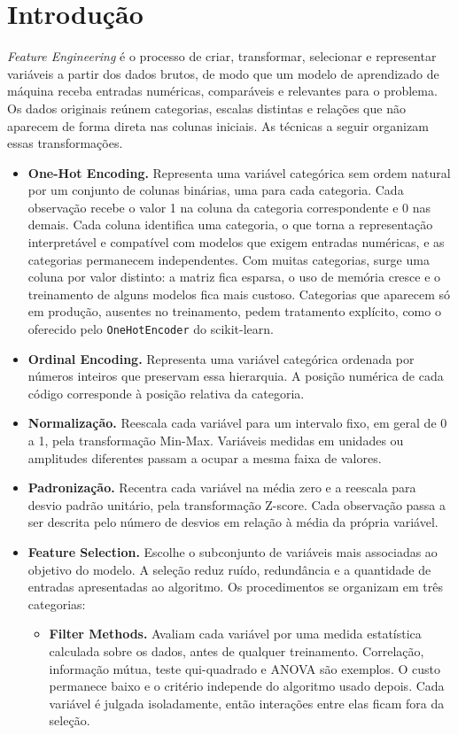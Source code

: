 \section{Introdução}

\textit{Feature Engineering} é o processo de criar, transformar, selecionar e representar variáveis a partir dos dados brutos, de modo que um modelo de aprendizado de máquina receba entradas numéricas, comparáveis e relevantes para o problema. Os dados originais reúnem categorias, escalas distintas e relações que não aparecem de forma direta nas colunas iniciais. As técnicas a seguir organizam essas transformações.

\begin{itemize}
    \item \textbf{One-Hot Encoding.} Representa uma variável categórica sem ordem natural por um conjunto de colunas binárias, uma para cada categoria. Cada observação recebe o valor 1 na coluna da categoria correspondente e 0 nas demais. Cada coluna identifica uma categoria, o que torna a representação interpretável e compatível com modelos que exigem entradas numéricas, e as categorias permanecem independentes. Com muitas categorias, surge uma coluna por valor distinto: a matriz fica esparsa, o uso de memória cresce e o treinamento de alguns modelos fica mais custoso. Categorias que aparecem só em produção, ausentes no treinamento, pedem tratamento explícito, como o oferecido pelo \texttt{OneHotEncoder} do scikit-learn.

    \item \textbf{Ordinal Encoding.} Representa uma variável categórica ordenada por números inteiros que preservam essa hierarquia. A posição numérica de cada código corresponde à posição relativa da categoria.

    \item \textbf{Normalização.} Reescala cada variável para um intervalo fixo, em geral de 0 a 1, pela transformação Min-Max. Variáveis medidas em unidades ou amplitudes diferentes passam a ocupar a mesma faixa de valores.

    \item \textbf{Padronização.} Recentra cada variável na média zero e a reescala para desvio padrão unitário, pela transformação Z-score. Cada observação passa a ser descrita pelo número de desvios em relação à média da própria variável.

    \item \textbf{Feature Selection.} Escolhe o subconjunto de variáveis mais associadas ao objetivo do modelo. A seleção reduz ruído, redundância e a quantidade de entradas apresentadas ao algoritmo. Os procedimentos se organizam em três categorias:
    \begin{itemize}
        \item \textbf{Filter Methods.} Avaliam cada variável por uma medida estatística calculada sobre os dados, antes de qualquer treinamento. Correlação, informação mútua, teste qui-quadrado e ANOVA são exemplos. O custo permanece baixo e o critério independe do algoritmo usado depois. Cada variável é julgada isoladamente, então interações entre elas ficam fora da seleção.


\end{itemize}
\end{itemize}

